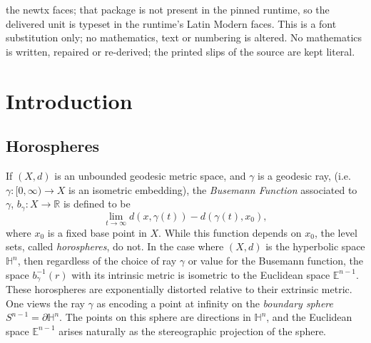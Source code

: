 \documentclass[10pt,a4paper]{amsart}
\newcommand{\R}{\mathbb{R}}
\newcommand{\h}{\mathbb{H}}
\newcommand{\E}{\mathbb{E}}
\theoremstyle{definition}
\theoremstyle{remark}
\begin{document}
the newtx faces; that package is not present in the pinned runtime, so the delivered unit is typeset in the runtime's Latin Modern faces. This is a font substitution only; no mathematics, text or numbering is altered. No mathematics is written, repaired or re-derived; the printed slips of the source are kept literal.
	\section{Introduction}
	\label{sec:intro}
	
	\subsection*{Horospheres}
    
    If $(X,d)$ is an unbounded geodesic metric space, and $\gamma$ is a geodesic ray, (i.e. $\gamma:[0,\infty)\to X$ is an isometric embedding), the \textit{Busemann Function} associated to $\gamma$, $b_\gamma:X\to \R$ is defined to be $$\lim_{t\to\infty} d(x, \gamma(t))-d(\gamma(t), x_0),$$ where $x_0$ is a fixed base point in $X$. While this function depends on $x_0$, the level sets, called  \textit{horospheres}, do not. In the case where $(X,d)$ is the hyperbolic space $\h^n$, then regardless of the choice of ray $\gamma$ or value for the Busemann function, the space $b_\gamma^{-1}(r)$ with its intrinsic metric is isometric to the Euclidean space $\E^{n-1}$. These horospheres are exponentially distorted relative to their extrinsic metric. One views the ray $\gamma$ as encoding a point at infinity on the \textit{boundary sphere} $S^{n-1}=\partial \h^n$. The points on this sphere are directions in $\h^n$, and the Euclidean space $\E^{n-1}$ arises naturally as the stereographic projection of the sphere.
	
\end{document}
